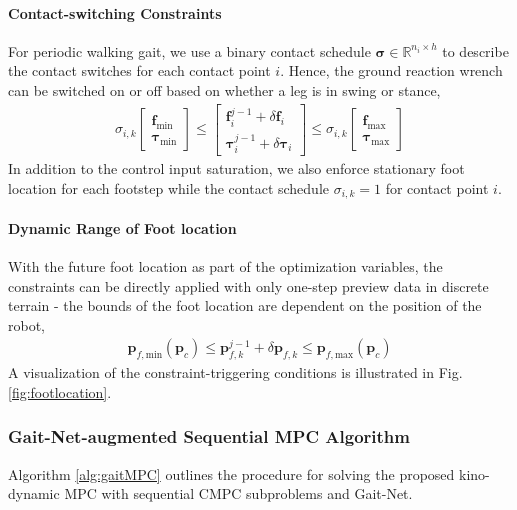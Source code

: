 \paragraph{Contact-switching Constraints}
For periodic walking gait, we use a binary contact schedule $\bm \sigma \in \mathbb R^{n_i\times h}$ to describe the contact switches for each contact point $i$. Hence, the ground reaction wrench can be switched on or off based on whether a leg is in swing or stance, 
\begin{align}
    \label{eq:contactConstraint1}
     \sigma_{i,k}
    \begin{bmatrix}
        \bm f_\text{min} \\ \bm \tau_\text{min} 
    \end{bmatrix} \leq
    \begin{bmatrix}
        \bm f^{j-1}_i + \delta \bm f_i \\ \bm \tau^{j-1}_i  + \delta \bm \tau_i
    \end{bmatrix} \leq 
    \sigma_{i,k}
    \begin{bmatrix}
        \bm f_\text{max} \\ \bm \tau_\text{max} 
    \end{bmatrix}  
\end{align}
In addition to the control input saturation, we also enforce stationary foot location for each footstep while the contact schedule $\sigma_{i,k} = 1$ for contact point $i$.

\paragraph{Dynamic Range of Foot location}
With the future foot location as part of the optimization variables, the constraints can be directly applied with only one-step preview data in discrete terrain - the bounds of the foot location are dependent on the position of the robot,  
\begin{align}
    \bm p_{f,\text{min}}(\bm p_c) \leq \bm p^{j-1}_{f,k} +\delta \bm p_{f,k} \leq \bm p_{f,\text{max}}(\bm p_c)
    \label{eq:KDfoot}
\end{align}
A visualization of the constraint-triggering conditions is illustrated in Fig. \ref{fig:footlocation}. 


\subsubsection{Gait-Net-augmented Sequential MPC Algorithm}
Algorithm \ref{alg:gaitMPC} outlines the procedure for solving the proposed kino-dynamic MPC with sequential CMPC subproblems and Gait-Net. 


